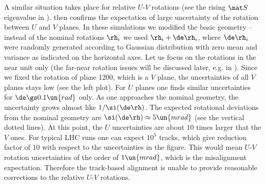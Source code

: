 
A similar situation takes place for relative $U$-$V$ rotations (see the rising $\mat S$ eigenvalue in ).  then confirms the expectation of large uncertainty of the rotation between $U$ and $V$ planes. In these simulations we modified the basic geometry -- instead of the nominal rotations $\rh_i$ we used $\rh_i + \de\rh_i$, where $\de\rh_i$ were randomly generated according to Gaussian distribution with zero mean and variance as indicated on the horizontal axes. Let us focus on the rotations in the near unit only (the far-near rotation issues will be discussed later, e.g. in ). Since we fixed the rotation of plane 1200, which is a $V$ plane, the uncertainties of all $V$ planes stays low (see the left plot). For $U$ planes one finds similar uncertainties for $\de\gs 0.1\un{rad}$ only. As one approaches the nominal geometry, the uncertainty grows almost like $1/\si(\de\rh)$. The expected rotational deviations from the nominal geometry are $\si(\de\rh) \approx 5\un{mrad}$ (see the vertical dotted lines). At this point, the $U$ uncertainties are about $10$ times larger that the $V$ ones. For typical LHC runs one can expect $10^5$ tracks, which give reduction factor of $10$ with respect to the uncertainties in the figure. This would mean $U$-$V$ rotation uncertainties of the order of $1\un{mrad}$, which is the misalignment expectation. Therefore the track-based alignment is unable to provide reasonable corrections to the relative $U$-$V$ rotations.


